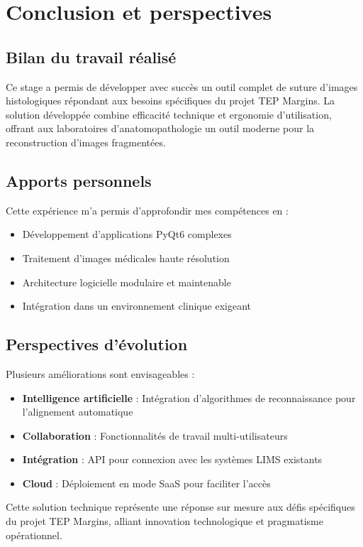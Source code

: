 \documentclass[11pt,a4paper]{report}
\begin{document}
\chapter{Conclusion et perspectives}

\section{Bilan du travail réalisé}

Ce stage a permis de développer avec succès un outil complet de suture d'images histologiques répondant aux besoins spécifiques du projet TEP Margins. La solution développée combine efficacité technique et ergonomie d'utilisation, offrant aux laboratoires d'anatomopathologie un outil moderne pour la reconstruction d'images fragmentées.

\section{Apports personnels}

Cette expérience m'a permis d'approfondir mes compétences en :

\begin{itemize}
\item Développement d'applications PyQt6 complexes
\item Traitement d'images médicales haute résolution
\item Architecture logicielle modulaire et maintenable
\item Intégration dans un environnement clinique exigeant
\end{itemize}

\section{Perspectives d'évolution}

Plusieurs améliorations sont envisageables :

\begin{itemize}
\item \textbf{Intelligence artificielle} : Intégration d'algorithmes de reconnaissance pour l'alignement automatique
\item \textbf{Collaboration} : Fonctionnalités de travail multi-utilisateurs
\item \textbf{Intégration} : API pour connexion avec les systèmes LIMS existants
\item \textbf{Cloud} : Déploiement en mode SaaS pour faciliter l'accès
\end{itemize}

Cette solution technique représente une réponse sur mesure aux défis spécifiques du projet TEP Margins, alliant innovation technologique et pragmatisme opérationnel.
\end{document}
